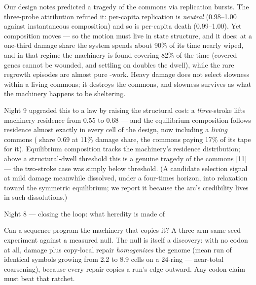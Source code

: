 Our design notes predicted a tragedy of the commons via
replication bursts. The three-probe attribution refuted it:
per-capita replication is {\it neutral} (0.98--1.00 against
instantaneous composition) and so is per-capita death
(0.99--1.00). Yet composition moves --- so the motion must live in
state structure, and it does: at a one-third damage share the
system spends about 90\% of its time nearly wiped, and in that
regime the machinery is found covering  82\% of the time
(covered genes cannot be wounded, and settling on  doubles
the dwell), while the rare regrowth episodes are almost pure
-work. Heavy damage does not select slowness within a living
commons; it destroys the commons, and slowness survives as what
the machinery happens to be sheltering.

Night 9 upgraded this to a law by raising the structural cost: a
{\it three}-stroke  lifts machinery residence from 0.55 to
0.68 --- and the equilibrium composition follows residence almost
exactly in every cell of the design, now including a {\it living}
commons ( share 0.69 at 11\% damage share, the commons paying
17\% of its tape for it).  Equilibrium composition
tracks the machinery's residence distribution; above a
structural-dwell threshold this is a genuine tragedy of the
commons [11] --- the two-stroke case was simply below threshold.
(A candidate selection signal at mild damage meanwhile dissolved,
under a four-times horizon, into relaxation toward the symmetric
equilibrium; we report it because the arc's credibility lives in
such dissolutions.)

\secc Night 8 --- closing the loop: what heredity is made of

Can a sequence program the machinery that copies it? A three-arm
same-seed experiment against a measured null. The null is itself a
discovery: with no codon at all, damage plus copy-local repair
{\it homogenizes} the genome (mean run of identical symbols
growing from 2.2 to 8.9 cells on a 24-ring --- near-total
coarsening), because every repair copies a run's edge outward. Any
codon claim must beat that ratchet.

